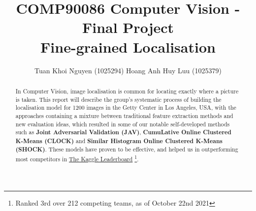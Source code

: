 \documentclass[11pt]{article}
\title{\vspace{-1cm}\bf\large COMP90086 Computer Vision - Final Project\\\LARGE Fine-grained Localisation}
\author{Tuan Khoi Nguyen (1025294) \hspace{3cm} Hoang Anh Huy Luu (1025379)\\
        }
\begin{document}
\maketitle
\setlength{\columnsep}{1.5cm}
\setlength{\columnseprule}{0.5pt}

\vspace{-0.5cm}
\renewcommand{\abstractname}{Introduction}
\begin{abstract}
\noindent In Computer Vision, image localisation is common for locating exactly where a picture is taken. This report will describe the group's systematic process of building the localisation model for 1200 images in the Getty Center in Los Angeles, USA, with the approaches containing a mixture between traditional feature extraction methods and new evaluation ideas, which resulted in some of our notable self-developed methods such as \textbf{Joint Adversarial Validation (JAV)}, \textbf{CumuLative Online Clustered K-Means (CLOCK)} and \textbf{Similar Histogram Online Clustered K-Means (SHOCK)}. These models have proven to be effective, and helped us in outperforming most competitors in \hyperlink{https://www.kaggle.com/c/comp90086-2021/overview}{The Kaggle Leaderboard} \footnote{Ranked 3rd over 212 competing teams, as of October 22nd 2021}.
\end{abstract}
\end{document}
